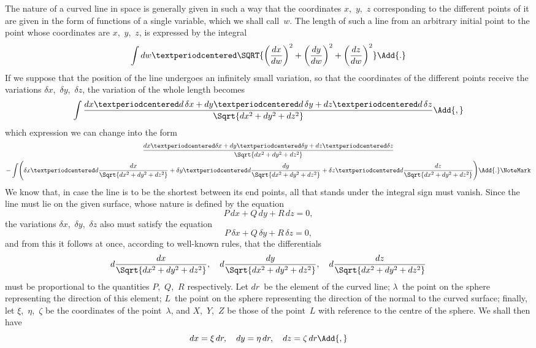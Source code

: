 
The nature of a curved line in space is generally given in such a way that the
coordinates $x$,~$y$,~$z$ corresponding to the different points of it are given in the form of
functions of a single variable, which we shall call~$w$. The length of such a line from
an arbitrary initial point to the point whose coordinates are $x$,~$y$,~$z$, is expressed by
the integral
\[
\int dw·\SQRT{
    \left(\frac{dx}{dw}\right)^{2}
  + \left(\frac{dy}{dw}\right)^{2}
  + \left(\frac{dz}{dw}\right)^{2}}\Add{.}
\]
If we suppose that the position of the line undergoes an infinitely small variation, so
that the coordinates of the different points receive the variations $\delta x$,~$\delta y$,~$\delta z$, the variation
of the whole length becomes
\[
\int \frac{dx·d\, \delta x + dy·d\, \delta y + dz·d\, \delta z}
          {\Sqrt{dx^{2} + dy^{2} + dz^{2}}}\Add{,}
\]
which expression we can change into the form
\begin{multline*}
\frac{dx·\delta x + dy·\delta y + dz·\delta z}
     {\Sqrt{dx^{2} + dy^{2} + dz^{2}}} \\
-\int \Biggl(
    \delta x·d\frac{dx}{\Sqrt{dx^{2} + dy^{2} + dz^{2}}}
  + \delta y·d\frac{dy}{\Sqrt{dx^{2} + dy^{2} + dz^{2}}}
  + \delta z·d\frac{dz}{\Sqrt{dx^{2} + dy^{2} + dz^{2}}}
  \Biggr)\Add{.}\NoteMark
\end{multline*}
We know that, in case the line is to be the shortest between its end points, all that
stands under the integral sign must vanish. Since the line must lie on the given
surface, whose nature is defined by the equation
\[
P\, dx + Q\, dy + R\, dz = 0,
\]
the variations $\delta x$,~$\delta y$,~$\delta z$ also must satisfy the equation
\[
P\, \delta x + Q\, \delta y + R\, \delta z = 0,
\]
and from this it follows at once, according to well-known rules, that the differentials
\[
d\frac{dx}{\Sqrt{dx^{2} + dy^{2} + dz^{2}}},\quad
d\frac{dy}{\Sqrt{dx^{2} + dy^{2} + dz^{2}}},\quad
d\frac{dz}{\Sqrt{dx^{2} + dy^{2} + dz^{2}}}
\]
must be proportional to the quantities $P$,~$Q$,~$R$ respectively. Let $dr$~be the element
of the curved line; $\lambda$~the point on the sphere representing the direction of this element;
$L$~the point on the sphere representing the direction of the normal to the curved
surface; finally, let $\xi$,~$\eta$,~$\zeta$ be the coordinates of the point~$\lambda$, and $X$,~$Y$,~$Z$ be those of
the point~$L$ with reference to the centre of the sphere. We shall then have
\[
dx = \xi\, dr,\quad
dy = \eta\, dr,\quad
dz = \zeta\, dr\Add{,}
\]
